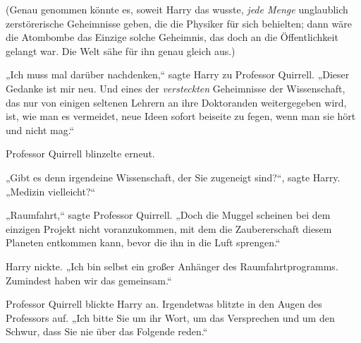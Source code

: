 (Genau genommen könnte es, soweit Harry das wusste, \emph{jede Menge} unglaublich zerstörerische Geheimnisse geben, die die Physiker für sich behielten; dann wäre die Atombombe das Einzige solche Geheimnis, das doch an die Öffentlichkeit gelangt war. Die Welt sähe für ihn genau gleich aus.)

„Ich muss mal darüber nachdenken,“ sagte Harry zu Professor Quirrell. „Dieser Gedanke ist mir neu. Und eines der \emph{versteckten} Geheimnisse der Wissenschaft, das nur von einigen seltenen Lehrern an ihre Doktoranden weitergegeben wird, ist, wie man es vermeidet, neue Ideen sofort beiseite zu fegen, wenn man sie hört und nicht mag.“

Professor Quirrell blinzelte erneut.

„Gibt es denn irgendeine Wissenschaft, der Sie zugeneigt sind?“, sagte Harry. „Medizin vielleicht?“

„Raumfahrt,“ sagte Professor Quirrell. „Doch die Muggel scheinen bei dem einzigen Projekt nicht voranzukommen, mit dem die Zaubererschaft diesem Planeten entkommen kann, bevor die ihn in die Luft sprengen.“

Harry nickte. „Ich bin selbst ein großer Anhänger des Raumfahrtprogramms. Zumindest haben wir das gemeinsam.“

Professor Quirrell blickte Harry an. Irgendetwas blitzte in den Augen des Professors auf. „Ich bitte Sie um ihr Wort, um das Versprechen und um den Schwur, dass Sie nie über das Folgende reden.“

